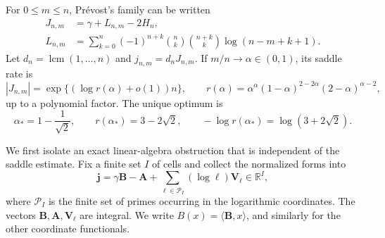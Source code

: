 \documentclass[11pt]{article}
\theoremstyle{keio}
\theoremstyle{definition}
\theoremstyle{remark}
\newcommand{\R}{\mathbb R}
\newcommand{\lcm}{\operatorname{lcm}}
\begin{document}
For \(0\le m\le n\), Pr\'evost's family \cite{Prevost2008} can be written
\begin{align}
 J_{n,m}&=\gamma+L_{n,m}-2H_n,\label{eq:prevost-form}\\
 L_{n,m}&=\sum_{k=0}^n(-1)^{n+k}
 \binom nk\binom{n+k}k\log(n-m+k+1).
 \label{eq:prevost-log}
\end{align}
Let \(d_n=\lcm(1,\ldots,n)\) and \(j_{n,m}=d_nJ_{n,m}\).  If
\(m/n\to\alpha\in(0,1)\), its saddle rate is
\begin{equation}\label{eq:prevost-rate}
 |J_{n,m}|=\exp\{(\log r(\alpha)+o(1))n\},
 \qquad
 r(\alpha)=
 \alpha^\alpha(1-\alpha)^{2-2\alpha}(2-\alpha)^{\alpha-2},
\end{equation}
up to a polynomial factor.  The unique optimum is
\begin{equation}\label{eq:prevost-optimum}
 \alpha_*=1-\frac1{\sqrt2},
 \qquad
 r(\alpha_*)=3-2\sqrt2,
 \qquad
 -\log r(\alpha_*)=\log(3+2\sqrt2).
\end{equation}

We first isolate an exact linear-algebra obstruction that is independent of
the saddle estimate.  Fix a finite set \(I\) of cells and collect the
normalized forms into
\begin{equation}\label{eq:prevost-vector}
 \mathbf j=\gamma\mathbf B-\mathbf A
 +\sum_{\ell\in\mathcal P_I}(\log\ell)\mathbf V_\ell\in\R^I,
\end{equation}
where \(\mathcal P_I\) is the finite set of primes occurring in the
logarithmic coordinates.  The vectors \(\mathbf B,\mathbf A,\mathbf V_\ell\)
are integral.  We write \(B(x)=\langle\mathbf B,x\rangle\), and similarly
for the other coordinate functionals.
\end{document}
